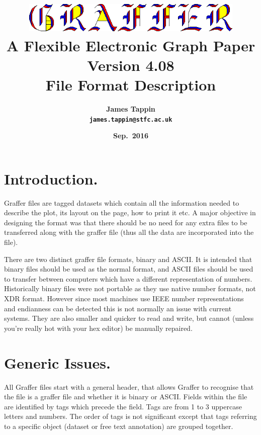 \documentclass[english]{article}
\begin{document}
\title{\includegraphics[width=0.80\textwidth]{logo} \\
A Flexible Electronic Graph Paper\\
Version 4.08\\
File Format Description}

\author{\textsf{\textbf{\Large James Tappin}}\\
\texttt{\textbf{\Large james.tappin@stfc.ac.uk}}}

\date{\textsf{\textbf{\large Sep.\ 2016}}}

\maketitle

\tableofcontents{}
\section{Introduction.}

Graffer files are tagged datasets which contain all the information
needed to describe the plot, its layout on the page, how to print
it etc. A major objective in designing the format was that there should
be no need for any extra files to be transferred along with the graffer
file (thus all the data are incorporated into the file).

There are two distinct graffer file formats, binary and ASCII. It is
intended that binary files should be used as the normal format, and
ASCII files should be used to transfer between computers which have a
different representation of numbers. Historically binary files were not
portable as they use native number formats, not XDR format. However
since most machines use IEEE number representations and endianness can
be detected this is not normally an issue with current systems. They
are also smaller and quicker to read and write, but cannot (unless
you're really hot with your hex editor) be manually repaired.


\section{Generic Issues.}

All Graffer files start with a general header, that allows Graffer
to recognise that the file is a graffer file and whether it is binary
or ASCII. Fields within the file are identified by tags which precede
the field. Tags are from 1 to 3 uppercase letters and numbers. The
order of tags is not significant except that tags referring to a specific
object (dataset or free text annotation) are grouped together.
\end{document}

